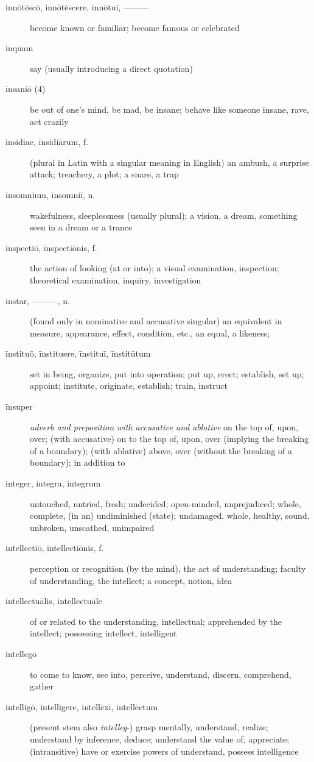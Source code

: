 \begin{description}
    \item[innōtēscō, innōtēscere, innōtuī, ———] become known or familiar; become famous or celebrated
    \item[inquam] \marginnote{*}say (usually introducing a direct quotation)
    \item[īnsaniō (4)] be out of one's mind, be mad, be insane; behave like someone insane, rave, act crazily
    \item[īnsidiae, īnsidiārum, f.] (plural in Latin with a singular meaning in English) an ambush, a surprise attack; treachery, a plot; a snare, a trap
    \item[īnsomnium, īnsomniī, n.] wakefulness, sleeplessness (usually plural); a vision, a dream, something seen in a dream or a trance
    \item[īnspectiō, īnspectiōnis, f.] the action of looking (at or into); a visual examination, inspection; theoretical examination, inquiry, investigation
    \item[īnstar, ———, n.] (found only in nominative and accusative singular) an equivalent in measure, appearance, effect, condition, etc., an equal, a likeness;
    \item[īnstituō, īnstituere, īnstituī, īnstitūtum] set in being, organize, put into operation; put up, erect; establish, set up; appoint; institute, originate, establish; train, instruct
    \item[īnsuper] \textit{adverb and preposition with accusative and ablative} on the top of, upon, over; (with accusative) on to the top of, upon, over (implying the breaking of a boundary); (with ablative) above, over (without the breaking of a boundary); in addition to
    \item[integer, integra, integrum] \marginnote{*}untouched, untried, fresh; undecided; open-minded, unprejudiced; whole, complete, (in an) undiminished (state); undamaged, whole, healthy, sound, unbroken, unscathed, unimpaired
    \item[intellectiō, intellectiōnis, f.] perception or recognition (by the mind), the act of understanding; faculty of understanding, the intellect; a concept, notion, idea
    \item[intellectuālis, intellectuāle] of or related to the understanding, intellectual; apprehended by the intellect; possessing intellect, intelligent
    \item[intellego] to come to know, see into, perceive, understand, discern, comprehend, gather
    \item[intelligō, intelligere, intellēxī, intellēctum] (present stem also \textit{intelleg}-) grasp mentally, understand, realize; understand by inference, deduce; understand the value of, appreciate; (intransitive) have or exercise powers of understand, possess intelligence

\end{description}
